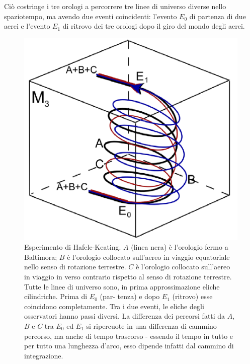 Ciò costringe i tre orologi a percorrere tre linee di universo diverse nello spaziotempo, 
ma avendo due eventi coincidenti: l'evento $E_0$ di partenza di due aerei e l'evento $E_1$ di ritrovo dei tre orologi
dopo il giro del mondo degli aerei.

\begin{figure}[htbp]
   \centering
   \includegraphics[scale=1]{immagini/conferme_relspec/hafele_keating.png}
   \caption{\label{hafele_keating} Esperimento di Hafele-Keating. $A$ (linea nera) è l'orologio
fermo a Baltimora; $B$ è l'orologio collocato sull'aereo in viaggio equatoriale
nello senso di rotazione terrestre. $C$ è l'orologio collocato sull'aereo in viaggio
in verso contrario rispetto al senso di rotazione terrestre. Tutte le linee di
universo sono, in prima approssimazione eliche cilindriche. Prima di $E_0$ (par-
tenza) e dopo $E_1$ (ritrovo) esse coincidono completamente. Tra i due eventi, le
eliche degli osservatori hanno passi diversi. La differenza dei percorsi fatti da
$A$, $B$ e $C$ tra $E_0$ ed $E_1$ si ripercuote in una differenza di cammino percorso, ma
anche di tempo trascorso - essendo il tempo in tutto e per tutto una lunghezza
d'arco, esso dipende infatti dal cammino di integrazione.}
\end{figure}

